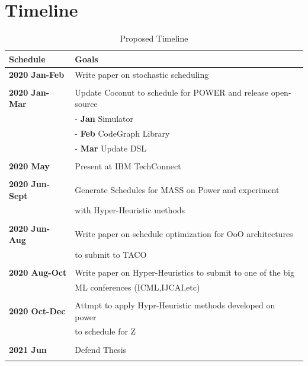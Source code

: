 \documentclass[12pt]{report}
\begin{document}
\chapter{Timeline}
\label{sec:orge7ec8e4}

\begin{table}[htbp]
\caption{\label{tab:ProposedTimeline}
Proposed Timeline}
\centering
\begin{tabular}{ll}
\textbf{Schedule} & \textbf{Goals}\\
\hline
\textbf{2020 Jan-Feb} & Write paper on stochastic scheduling\\
 & \\
\hline
\textbf{2020 Jan-Mar} & Update Coconut to schedule for POWER and release open-source\\
 & - \textbf{Jan} Simulator\\
 & - \textbf{Feb} CodeGraph Library\\
 & - \textbf{Mar} Update DSL\\
 & \\
\hline
\textbf{2020 May} & Present at IBM TechConnect\\
 & \\
\hline
\textbf{2020 Jun-Sept} & Generate Schedules for MASS on Power and experiment\\
 & with Hyper-Heuristic methods\\
 & \\
\hline
\textbf{2020 Jun-Aug} & Write paper on schedule optimization for OoO architectures\\
 & to submit to TACO\\
 & \\
\hline
\textbf{2020 Aug-Oct} & Write paper on Hyper-Heuristics to submit to one of the big\\
 & ML conferences (ICML,IJCAI,etc)\\
 & \\
\hline
\textbf{2020 Oct-Dec} & Attmpt to apply Hypr-Heuristic methods developed on power\\
 & to schedule for Z\\
 & \\
\hline
\textbf{2021 Jun} & Defend Thesis\\
 & \\
\hline
\end{tabular}
\end{table}

\printbibliography
\end{document}
